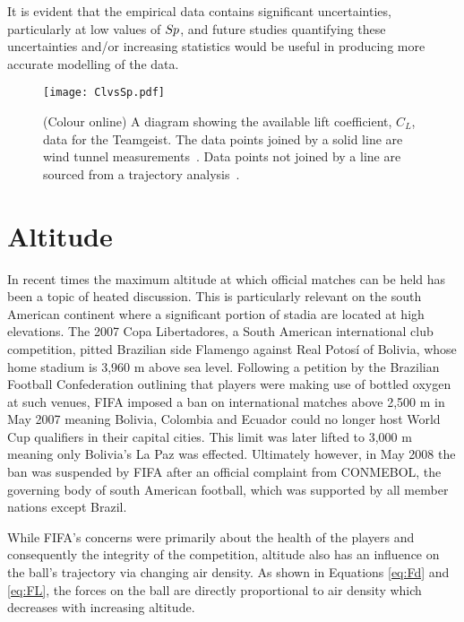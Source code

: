 \documentclass[a4paper]{article}
\begin{document}
It is evident that the empirical data contains significant uncertainties, particularly at low values of $S\!{\kern 0.125em}p$, and future studies quantifying these uncertainties and/or increasing statistics would be useful in producing more accurate modelling of the data.
%
%
\begin{figure}[t] 
  \centering
  {\texttt{[image: ClvsSp.pdf]}}
  \caption{(Colour online) A diagram showing the available lift coefficient, $C_{L}$, data for the Teamgeist.  The data points joined by a solid line are wind tunnel measurements~\cite{AsaiTSeoKKobayashiOandSakashitaR}.  Data points not joined by a line are sourced from a trajectory analysis~\cite{JEGoff}.}
 \label{fig:CLvsSpTeamgeist}
\end{figure}
%
%
\section{Altitude}
\label{sect:Altitude}
In recent times the maximum altitude at which official matches can be held has been a topic of heated discussion.  This is particularly relevant on the south American continent where a significant portion of stadia are located at high elevations.  The 2007 Copa Libertadores, a South American international club competition, pitted Brazilian side Flamengo against Real Potos\'i of Bolivia, whose home stadium is 3,960 m above sea level.  Following a petition by the Brazilian Football Confederation outlining that players were making use of bottled oxygen at such venues, FIFA imposed a ban on international matches above 2,500 m in May 2007 meaning Bolivia, Colombia and Ecuador could no longer host World Cup qualifiers in their capital cities.  This limit was later lifted to 3,000 m meaning only Bolivia's La Paz was effected.  Ultimately however, in May 2008 the ban was suspended by FIFA after an official complaint from CONMEBOL, the governing body of south American football, which was supported by all member nations except Brazil.

While FIFA's concerns were primarily about the health of the players and consequently the integrity of the competition, altitude also has an influence on the ball's trajectory via changing air density.  As shown in Equations \ref{eq:Fd} and \ref{eq:FL}, the forces on the ball are directly proportional to air density which decreases with increasing altitude.
\end{document}
